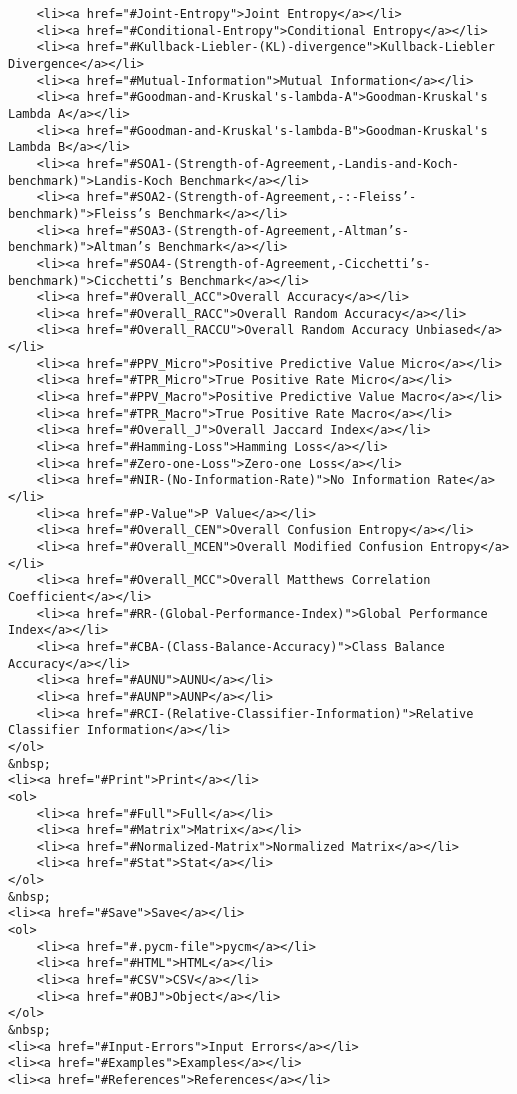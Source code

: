 \documentclass[11pt]{article}
\begin{document}
\begin{verbatim}
    <li><a href="#Joint-Entropy">Joint Entropy</a></li>
    <li><a href="#Conditional-Entropy">Conditional Entropy</a></li>
    <li><a href="#Kullback-Liebler-(KL)-divergence">Kullback-Liebler Divergence</a></li>
    <li><a href="#Mutual-Information">Mutual Information</a></li>
    <li><a href="#Goodman-and-Kruskal's-lambda-A">Goodman-Kruskal's Lambda A</a></li>
    <li><a href="#Goodman-and-Kruskal's-lambda-B">Goodman-Kruskal's Lambda B</a></li>
    <li><a href="#SOA1-(Strength-of-Agreement,-Landis-and-Koch-benchmark)">Landis-Koch Benchmark</a></li>
    <li><a href="#SOA2-(Strength-of-Agreement,-:-Fleiss’-benchmark)">Fleiss’s Benchmark</a></li>
    <li><a href="#SOA3-(Strength-of-Agreement,-Altman’s-benchmark)">Altman’s Benchmark</a></li>
    <li><a href="#SOA4-(Strength-of-Agreement,-Cicchetti’s-benchmark)">Cicchetti’s Benchmark</a></li>
    <li><a href="#Overall_ACC">Overall Accuracy</a></li>
    <li><a href="#Overall_RACC">Overall Random Accuracy</a></li>
    <li><a href="#Overall_RACCU">Overall Random Accuracy Unbiased</a></li>
    <li><a href="#PPV_Micro">Positive Predictive Value Micro</a></li>
    <li><a href="#TPR_Micro">True Positive Rate Micro</a></li>
    <li><a href="#PPV_Macro">Positive Predictive Value Macro</a></li>
    <li><a href="#TPR_Macro">True Positive Rate Macro</a></li>
    <li><a href="#Overall_J">Overall Jaccard Index</a></li>
    <li><a href="#Hamming-Loss">Hamming Loss</a></li>
    <li><a href="#Zero-one-Loss">Zero-one Loss</a></li>
    <li><a href="#NIR-(No-Information-Rate)">No Information Rate</a></li>
    <li><a href="#P-Value">P Value</a></li>
    <li><a href="#Overall_CEN">Overall Confusion Entropy</a></li>
    <li><a href="#Overall_MCEN">Overall Modified Confusion Entropy</a></li>
    <li><a href="#Overall_MCC">Overall Matthews Correlation Coefficient</a></li>
    <li><a href="#RR-(Global-Performance-Index)">Global Performance Index</a></li>
    <li><a href="#CBA-(Class-Balance-Accuracy)">Class Balance Accuracy</a></li>
    <li><a href="#AUNU">AUNU</a></li>
    <li><a href="#AUNP">AUNP</a></li>
    <li><a href="#RCI-(Relative-Classifier-Information)">Relative Classifier Information</a></li>
</ol>
&nbsp;
<li><a href="#Print">Print</a></li>
<ol>
    <li><a href="#Full">Full</a></li>
    <li><a href="#Matrix">Matrix</a></li>
    <li><a href="#Normalized-Matrix">Normalized Matrix</a></li>
    <li><a href="#Stat">Stat</a></li>
</ol>
&nbsp;
<li><a href="#Save">Save</a></li>
<ol>
    <li><a href="#.pycm-file">pycm</a></li>
    <li><a href="#HTML">HTML</a></li>
    <li><a href="#CSV">CSV</a></li>
    <li><a href="#OBJ">Object</a></li>
</ol>
&nbsp;
<li><a href="#Input-Errors">Input Errors</a></li>
<li><a href="#Examples">Examples</a></li>
<li><a href="#References">References</a></li>
\end{verbatim}
\end{document}
